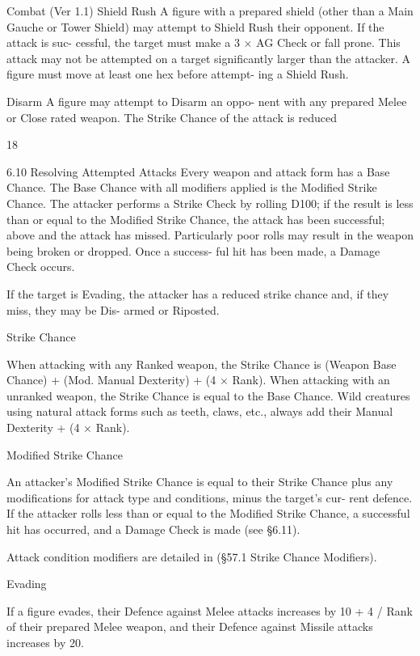 \begin{Chapter}{Combat (Ver 1.1)}
Shield Rush A figure with a prepared shield (other 
than a Main Gauche or Tower Shield) may attempt 
to Shield Rush their opponent. If the attack is suc-
cessful,  the  target  must  make  a  3  ×  AG  Check  or 
fall  prone.  This  attack  may  not  be  attempted  on  a 
target  significantly  larger  than  the  attacker.  A 
figure  must  move  at  least  one  hex  before  attempt-
ing a Shield Rush. 

Disarm  A figure may attempt to Disarm an oppo-
nent  with  any  prepared  Melee  or  Close  rated 
weapon. The Strike Chance of the attack is reduced 

18 

6.10 Resolving Attempted Attacks 
Every weapon and attack form has a Base Chance. 
The  Base  Chance  with all  modifiers applied  is  the 
Modified  Strike  Chance.  The  attacker  performs  a 
Strike  Check  by  rolling  D100;  if  the  result  is  less 
than  or  equal  to  the  Modified  Strike  Chance,  the 
attack  has  been  successful;  above  and  the  attack 
has missed. Particularly poor rolls may result in the 
weapon being broken or dropped. Once a success-
ful hit has been made, a Damage Check occurs. 

If the target is Evading, the attacker has a reduced 
strike  chance  and,  if  they  miss,  they  may  be  Dis-
armed or Riposted. 

Strike Chance 

When  attacking  with  any  Ranked  weapon,  the 
Strike  Chance  is  (Weapon  Base  Chance)  +  (Mod. 
Manual  Dexterity)  +  (4  ×  Rank).  When  attacking 
with  an  unranked  weapon,  the  Strike  Chance  is 
equal  to  the  Base  Chance.  Wild  creatures  using 
natural  attack  forms  such  as  teeth,  claws,  etc., 
always add their Manual Dexterity + (4 × Rank). 

Modified Strike Chance 

An  attacker’s  Modified  Strike  Chance  is  equal  to 
their  Strike  Chance  plus  any  modifications  for 
attack  type  and  conditions,  minus  the  target’s  cur-
rent defence. If the attacker rolls less than or equal 
to the Modified Strike Chance, a successful hit has 
occurred,  and  a  Damage  Check  is  made  (see 
§6.11). 

Attack  condition  modifiers  are  detailed  in  (§57.1 
Strike Chance Modifiers). 

Evading 

If  a  figure  evades,  their  Defence  against  Melee 
attacks increases by 10 + 4 / Rank of their prepared 
Melee  weapon,  and  their  Defence  against  Missile 
attacks increases by 20. 


\end{Chapter}
